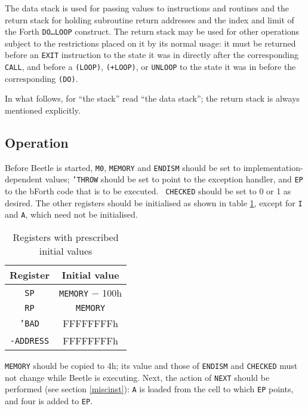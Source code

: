 The data stack is used for passing values to instructions and routines and the
return stack for holding subroutine return addresses and the index and limit of
the Forth {\tt DO\dots LOOP} construct. The return stack may be used for other
operations subject to the restrictions placed on it by its normal usage: it must
be returned before an {\tt EXIT} instruction to the state it was in directly
after the corresponding {\tt CALL}, and before a {\tt (LOOP)}, {\tt (+LOOP)}, or
{\tt UNLOOP} to the state it was in before the corresponding {\tt (DO)}.

In what follows, for ``the stack'' read ``the data stack''; the return stack is
always mentioned explicitly.


\subsection{Operation}
\label{operation}

Before Beetle is started, {\tt M0}, {\tt MEMORY} and {\tt ENDISM} should be set
to implementation-dependent values; {\tt 'THROW} should be set to point to the
exception handler, and {\tt EP} to the bForth code that is to be executed. {\tt
CHECKED} should be set to 0 or 1 as desired. The other registers should be
initialised as shown in table \ref{inittable}, except for {\tt I} and {\tt A},
which need not be initialised.

\begin{table}[htbp]
\begin{center}
\begin{tabular}{|c|c|} \hline
\rule[-2mm]{0mm}{6mm}\bf Register & \bf Initial value \\ \hline
{\tt SP} & {\tt MEMORY} $-$ 100h \\
{\tt RP} & {\tt MEMORY} \\
{\tt 'BAD} & {FFFFFFFFh} \\
{\tt -ADDRESS} & {FFFFFFFFh} \\ \hline
\end{tabular}
\end{center}
\vspace{-2mm}
\caption{\label{inittable}Registers with prescribed initial values}
\end{table}

{\tt MEMORY} should be copied to 4h; its value and those of {\tt ENDISM} and
{\tt CHECKED} must not change while Beetle is executing. Next, the action of
{\tt NEXT} should be performed (see section \ref{miscinst}): {\tt A} is loaded
from the cell to which {\tt EP} points, and four is added to {\tt EP}.

